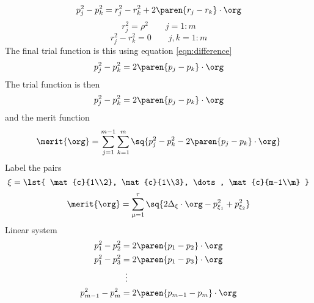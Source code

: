  \begin{equation}
    p_{j}^{2} - p_{k}^{2} = r_{j}^{2} - r_{k}^{2} + 2 \paren{r_{j} - r_{k}} \cdot \org
  \end{equation}
  \begin{equation}
    r_{j}^{2} = \rho^{2} \qquad j = 1\colon m
  \end{equation}
  \begin{equation}
    r_{j}^{2} - r_{k}^{2} = 0 \qquad j,k = 1\colon m
  \end{equation}
The final trial function is this using equation \eqref{eqn:difference}
  \begin{equation}
    p_{j}^{2} - p_{k}^{2} = 2 \paren{p_{j} - p_{k}} \cdot \org
  \end{equation}
The trial function is then
  \begin{equation}
    p_{j}^{2} - p_{k}^{2} = 2 \paren{p_{j} - p_{k}} \cdot \org
  \end{equation}
and the merit function
  \begin{equation}
    \merit{\org} = \sum_{j=1}^{m-1} \sum_{k=1}^{m} \sq{p_{j}^{2} - p_{k}^{2} - 2 \paren{p_{j} - p_{k}} \cdot \org}
  \end{equation}
Label the pairs
  \begin{equation}
    \xi = \lst{ \mat{c}{1\\2}, \mat{c}{1\\3}, \dots, \mat{c}{m-1\\m} }
  \end{equation}
  \begin{equation}
    \merit{\org} = \sum_{\mu=1}^{\tau} \sq{2\Delta_{\xi} \cdot \org -p_{\xi_{1}}^{2} + p_{\xi_{2}}^{2}}
  \end{equation}
Linear system
\begin{equation}
  \begin{split}
    p_{1}^{2} - p_{2}^{2} &= 2\paren{p_{1}-p_{2}}\cdot \org \\ 
    p_{1}^{2} - p_{3}^{2} &= 2\paren{p_{1}-p_{3}}\cdot \org \\ 
    &  \ \, \vdots \\
    p_{m-1}^{2} - p_{m}^{2} &= 2\paren{p_{m-1}-p_{m}}\cdot \org
  \end{split}
\end{equation}
